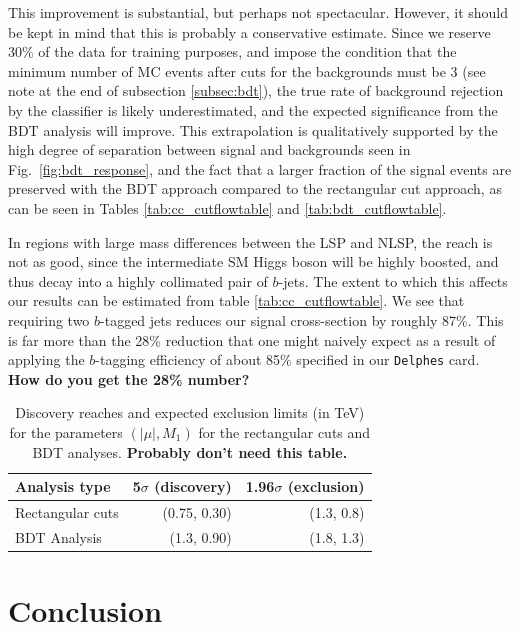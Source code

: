 \documentclass[a4paper,11pt]{article}
\newcommand{\Shufang}[1]{{\bf\color{Maroon}  #1}}
\begin{document}
This improvement is substantial, but perhaps not spectacular. However, it should
be kept in mind that this is probably a conservative estimate. Since we reserve
30\% of the data for training purposes, and impose the condition that the
minimum number of MC events after cuts for the backgrounds must be 3 (see note
at the end of subsection \ref{subsec:bdt}), the true rate of background
rejection by the classifier is likely underestimated, and the expected
significance from the BDT analysis will improve. This extrapolation is
qualitatively supported by the high degree of separation between signal and
backgrounds seen in Fig.~\ref{fig:bdt_response}, and the fact that a larger
fraction of the signal events are preserved with the BDT approach compared to
the rectangular cut approach, as can be seen in Tables \ref{tab:cc_cutflowtable}
and \ref{tab:bdt_cutflowtable}.  

In regions with large mass differences between the LSP and NLSP, the reach is
not as good, since the intermediate SM Higgs boson will be highly boosted, and
thus decay into a highly collimated pair of $b$-jets. The extent to which this
affects our results can be estimated from table \ref{tab:cc_cutflowtable}. We
see that requiring two $b$-tagged jets reduces our signal cross-section by
roughly 87\%. This is far more than the 28\% reduction that one might naively
expect as a result of applying the $b$-tagging efficiency of about 85\%
specified in our \texttt{Delphes} card.  \Shufang{How do you get the 28\% number? }

\begin{table}[h]
\centering
\begin{tabular}{l|rr}
\toprule
Analysis type & 5$\sigma$ (discovery)& 1.96$\sigma$ (exclusion)\\
\midrule
Rectangular cuts & (0.75, 0.30) & (1.3, 0.8)\\
BDT Analysis & (1.3, 0.90) & (1.8, 1.3)\\
\bottomrule
\end{tabular}
\caption{Discovery reaches and expected exclusion limits (in TeV) for the
parameters $(|\mu|,M_1)$ for the rectangular cuts and BDT analyses. \Shufang{Probably don't need this table.} }
\label{tab:summary}
\end{table}

\section{Conclusion}\label{sec:conclusion}
\end{document}
